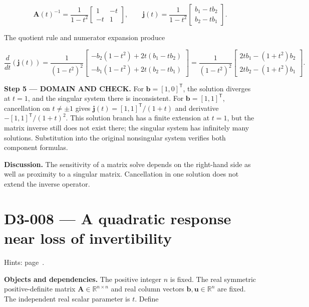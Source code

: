 \documentclass[11pt,oneside,openany]{book}
\begin{document}
\[
\mathbf A(t)^{-1}=\frac{1}{1-t^2}\begin{bmatrix}1&-t\\-t&1\end{bmatrix},\qquad
\mathbf j(t)=\frac{1}{1-t^2}\begin{bmatrix}b_1-tb_2\\b_2-tb_1\end{bmatrix}.
\]

The quotient rule and numerator expansion produce

\[
\frac{d}{dt}\left(\mathbf j(t)\right)
=\frac{1}{(1-t^2)^2}\begin{bmatrix}
-b_2(1-t^2)+2t(b_1-tb_2)\\
-b_1(1-t^2)+2t(b_2-tb_1)
\end{bmatrix}
=\frac{1}{(1-t^2)^2}\begin{bmatrix}2tb_1-(1+t^2)b_2\\2tb_2-(1+t^2)b_1\end{bmatrix}.
\]

\endgroup
\begin{DomainStep}
\textbf{Step 5 --- DOMAIN AND CHECK.} For \(\mathbf b=[1,0]^{\mathsf T}\), the solution diverges at \(t=1\), and the singular system there is inconsistent. For \(\mathbf b=[1,1]^{\mathsf T}\), cancellation on \(t\ne\pm1\) gives \(\mathbf j(t)=[1,1]^{\mathsf T}/(1+t)\) and derivative \(-[1,1]^{\mathsf T}/(1+t)^2\). This solution branch has a finite extension at \(t=1\), but the matrix inverse still does not exist there; the singular system has infinitely many solutions. Substitution into the original nonsingular system verifies both component formulas.

\end{DomainStep}
\textbf{Discussion.} The sensitivity of a matrix solve depends on the right-hand side as well as proximity to a singular matrix. Cancellation in one solution does not extend the inverse operator.
\clearpage
\section{D3-008 --- A quadratic response near loss of invertibility}
\label{problem:D3-008}
{\small Hints: page~\pageref{hints:D3-008}.}\par\medskip

\textbf{Objects and dependencies.} The positive integer \(n\) is fixed. The real symmetric positive-definite matrix \(\mathbf A\in\mathbb R^{n\times n}\) and real column vectors \(\mathbf b,\mathbf u\in\mathbb R^n\) are fixed. The independent real scalar parameter is \(t\). Define
\end{document}
